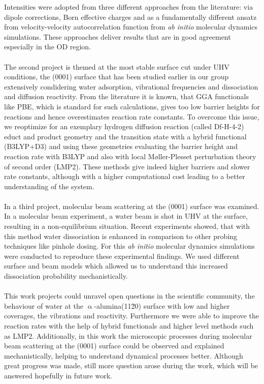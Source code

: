 \documentclass[11pt,DIV=13,a4paper,headinclude]{scrartcl}
\begin{document}
Intensities were adopted from three different approaches from the literature: via dipole corrections, Born effective charges and as a fundamentally different ansatz from velocity-velocity autocorrelation function from \textit{ab initio} molecular dynamics simulations.
These approaches deliver results that are in good agreement especially in the OD region.
\\
\\
The second project is themed at the most stable surface cut under UHV conditions, the (0001) surface that has been studied earlier in our group extensively condidering water adsorption, vibrational frequencies and dissociation and diffusion reactivity.
From the literature it is known, that GGA functionals like PBE, which is standard for such calculations, gives too low barrier heights for reactions and hence overestimates reaction rate constants.
To overcome this issue, we reoptimize for an exemplary hydrogen diffusion reaction (called Df-H-4-2) educt and product geometry and the transition state with a hybrid functional (B3LYP+D3) and using these geometries evaluating the barrier height and reaction rate with B3LYP and also with local M\o{}ller-Plesset perturbation theory of second order (LMP2).
These methods give indeed higher barriers and slower rate constants, although with a higher computational cost leading to a better understanding of the system.
\\
\\
In a third project, molecular beam scattering at the (0001) surface was examined.
In a molecular beam experiment, a water beam is shot in UHV at the surface, resulting in a non-equilibrium situation.
Recent experiments showed, that with this method water dissociation is enhanced in comparison to other probing techniques like pinhole dosing.
For this \textit{ab initio} molecular dynamics simulations were conducted to reproduce these experimental findings.
We used different surface and beam models which allowed us to understand this increased dissociation probability mechanistically.
\\
\\
This work projects could unravel open questions in the scientific community, the behaviour of water at the $\upalpha$-alumina(11\=20) surface with low and higher coverages, the vibrations and reactivity.
Furthermore we were able to improve the reaction rates with the help of hybrid functionals and higher level methods such as LMP2.
Additionally, in this work the microscopic processes during molecular beam scattering at the (0001) surface could be observed and explained mechanistically, helping to understand dynamical processes better.
Although great progress was made, still more question arose during the work, which will be answered hopefully in future work.
\end{document}
